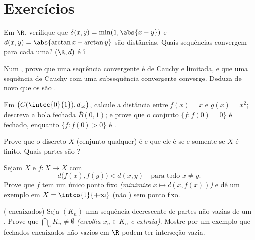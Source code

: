 \section{Exercícios}

\begin{exercise}[$\star$]\label{exo:b2:metric:1}
Em $\R$, verifique que $\delta(x, y) = \min(1, \abs{x - y})$ e
$d(x,y) = \abs{\arctan x - \arctan y}$ são distâncias. Quais
sequências convergem para cada uma? $(\R, d)$ é ?
\end{exercise}

\begin{exercise}[$\star$]\label{exo:b2:metric:2}
Num , prove que uma sequência convergente é de Cauchy e
limitada, e que uma sequência de Cauchy com uma subsequência convergente
converge. Deduza de novo que os  são .
\end{exercise}

\begin{exercise}[$\star$]\label{exo:b2:metric:3}
Em $\bigl(C(\intcc{0}{1}), d_\infty\bigr)$, calcule a distância
entre $f(x) = x$ e $g(x) = x^2$; descreva a bola fechada
$\overline B(0, 1)$; e prove que o conjunto $\{f : f(0) = 0\}$ é
fechado, enquanto $\{f : f(0) > 0\}$ é .
\end{exercise}

\begin{exercise}[$\star\star$]\label{exo:b2:metric:4}
Prove que o  discreto $X$ (conjunto qualquer) é  e
que ele é  se e somente se $X$ é finito. Quais partes são
?
\end{exercise}

\begin{exercise}[$\star\star$]\label{exo:b2:metric:5}
Sejam $X$  e $f \colon X \to X$ com
\[
d\bigl(f(x), f(y)\bigr) < d(x, y) \quad \text{para todo } x \neq y .
\]
Prove que $f$ tem um único ponto fixo \emph{(minimize $x \mapsto
d(x, f(x))$)} e dê um exemplo em $X = \intco{1}{+\infty}$
(não ) sem ponto fixo.
\end{exercise}

\begin{exercise}[$\star\star$]\label{exo:b2:metric:6}
( encaixados) Seja $(K_n)$ uma sequência decrescente de partes
 não vazias de um . Prove que $\bigcap_n K_n \neq
\emptyset$ \emph{(escolha $x_n \in K_n$ e extraia)}. Mostre por um exemplo
que fechados encaixados não vazios em $\R$ podem ter interseção
vazia.
\end{exercise}

